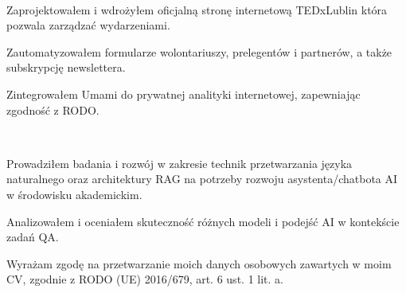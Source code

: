 \documentclass[]{deedy-resume-openfont}
\begin{document}
\begin{minipage}[t]{0.55\textwidth}
 \\

\begin{tightemize}
\item Zaprojektowałem i wdrożyłem oficjalną stronę internetową TEDxLublin która pozwala zarządzać wydarzeniami.
\item Zautomatyzowałem formularze wolontariuszy, prelegentów i partnerów, a także subskrypcję newslettera.
\item Zintegrowałem Umami do prywatnej analityki internetowej, zapewniając zgodność z RODO.
\end{tightemize}
\sectionsep

 \\
\begin{tightemize}
\item Prowadziłem badania i rozwój w zakresie technik przetwarzania języka naturalnego oraz architektury RAG na potrzeby rozwoju asystenta/chatbota AI w środowisku akademickim.
\item Analizowałem i oceniałem skuteczność różnych modeli i podejść AI w kontekście zadań QA.
\end{tightemize}
\sectionsep

\end{minipage} 

\vfill %
\begin{center}
    \scriptsize %
    Wyrażam zgodę na przetwarzanie moich danych osobowych zawartych w moim CV, zgodnie z RODO (UE) 2016/679, art. 6 ust. 1 lit. a.
\end{center}
\end{document}
